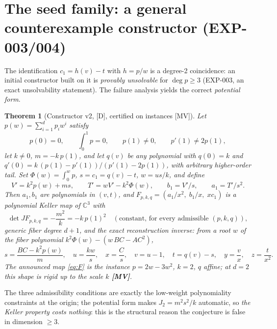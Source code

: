 \documentclass[11pt]{article}
\newtheorem{theorem}{Theorem}[section]
\theoremstyle{definition}
\theoremstyle{remark}
\newcommand{\C}{\mathbb{C}}
\begin{document}
\section{The seed family: a general counterexample constructor (EXP-003/004)}

The identification $c_1 = h(v) - t$ with $h = p/w$ is a degree-2 coincidence: an initial
constructor built on it is \emph{provably unsolvable} for $\deg p \ge 3$ (EXP-003, an exact
unsolvability statement). The failure analysis yields the correct \emph{potential form}.

\begin{theorem}[Constructor v2, {[D]}, certified on instances {[MV]}]\label{thm:family}
Let $p(w) = \sum_{i=1}^{d} p_i w^i$ satisfy
\[
p(0) = 0, \qquad \int_0^1 p = 0, \qquad p(1) \ne 0, \qquad p'(1) \ne 2 p(1),
\]
let $k \ne 0$, $m = -k\,p(1)$, and let $q(v)$ be any polynomial with $q(0) = k$ and
$q'(0) = k\,(p(1) - p'(1))/(p'(1) - 2p(1))$, with arbitrary higher-order tail. Set
$\Phi(w) = \int_0^w p$, $s = c_1 = q(v) - t$, $w = u s / k$, and define
\[
V' = k^2 p(w) + m s, \qquad T' = w V' - k^2 \Phi(w), \qquad
b_1 = V'/s, \qquad a_1 = T'/s^2 .
\]
Then $a_1, b_1$ are polynomials in $(v, t)$, and
$F_{p, k, q} = (a_1 / x^2,\; b_1 / x,\; x c_1)$ is a polynomial Keller map of $\C^3$ with
\[
\det J F_{p,k,q} = -\frac{m^2}{k} = -k\,p(1)^2 \quad (\text{constant, for every admissible } (p,k,q)),
\]
generic fiber degree $d + 1$, and the exact reconstruction inverse: from a root $w$ of the fiber
polynomial $k^2\Phi(w) - (w\,BC - AC^2)$,
\[
s = \frac{BC - k^2 p(w)}{m}, \quad u = \frac{k w}{s}, \quad x = \frac{C}{s}, \quad v = u - 1,
\quad t = q(v) - s, \quad y = \frac{v}{x}, \quad z = \frac{t}{x^2}.
\]
The announced map \eqref{eq:F} is the instance $p = 2w - 3w^2$, $k = 2$, $q$ affine; at $d = 2$
this shape is rigid up to the scale $k$ \textbf{[MV]}.
\end{theorem}

The three admissibility conditions are exactly the low-weight polynomiality constraints at the
origin; the potential form makes $J_2 = m^2 s^2 / k$ automatic, so \emph{the Keller property
costs nothing}: this is the structural reason the conjecture is false in dimension $\ge 3$.
\end{document}
